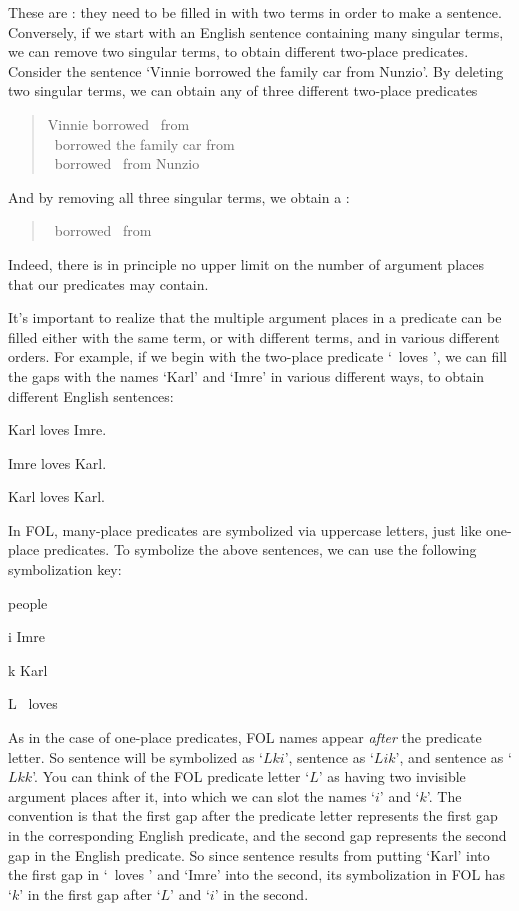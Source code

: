 These are : they need to be filled in with two terms in order to make a sentence. Conversely, if we start with an English sentence containing many singular terms, we can remove two singular terms, to obtain different two-place predicates. Consider the sentence `Vinnie borrowed the family car from Nunzio'. By deleting two singular terms, we can obtain any of three different two-place predicates
	\begin{quote}
		Vinnie borrowed \blank\ from \blank\\
		\blank\ borrowed the family car from \blank\\
		\blank\ borrowed \blank\ from Nunzio
	\end{quote}
And by removing all three singular terms, we  obtain a :
	\begin{quote}
		\blank\ borrowed \blank\ from \blank
	\end{quote}
Indeed, there is in principle no upper limit on the number of argument places that our predicates may contain.


It's important to realize that the multiple argument places in a predicate can be filled either with the same term, or with different terms, and in various different orders. For example, if we begin with the two-place predicate `\blank\ loves \blank{}', we can fill the gaps with the names `Karl' and `Imre' in various different ways, to obtain different English sentences:


\begin{earg}
	\item[\ex{terms3}] Karl loves Imre.
	\item[\ex{terms3b}] Imre loves Karl.
	\item[\ex{terms3a}] Karl loves Karl.
\end{earg}


In FOL, many-place predicates are symbolized via uppercase letters, just like one-place predicates.  To symbolize the above sentences, we can use the following symbolization key:
	\begin{ekey}
		\item[\text{domain}] people
		\item[i] Imre
		\item[k] Karl
		\item[L] \blank\ loves \blank
	\end{ekey}
As in the case of one-place predicates, FOL names appear \emph{after} the predicate letter.   So sentence  will be symbolized as `$Lki$', sentence  as `$Lik$', and sentence  as `$Lkk$'.  You can think of the FOL predicate letter `$L$' as having two invisible argument places after it, into which we can slot the names `$i$' and `$k$'.  The convention is that the first gap after the predicate letter represents the first gap in the corresponding English predicate, and the second gap represents the second gap in the English predicate.  So since sentence  results from putting `Karl' into the first gap in  `\blank\ loves \blank' and `Imre' into the second, its symbolization in FOL has `$k$' in the first gap after `$L$' and `$i$' in the second.

